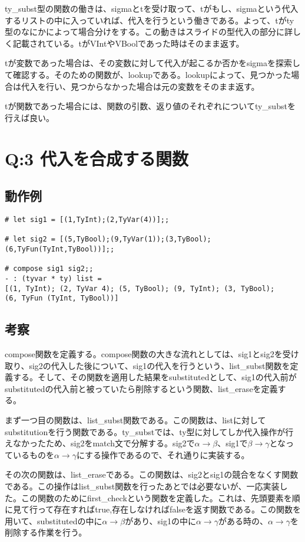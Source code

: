 \documentclass[uplatex,12pt]{jsarticle}
\begin{document}
ty\_subst型の関数の働きは、sigmaとtを受け取って、tがもし、sigmaという代入するリストの中に入っていれば、代入を行うという働きである。よって、tがty型のなにかによって場合分けをする。この動きはスライドの型代入の部分に詳しく記載されている。tがVIntやVBoolであった時はそのまま返す。

tが変数であった場合は、その変数に対して代入が起こるか否かをsigmaを探索して確認する。そのための関数が、lookupである。lookupによって、見つかった場合は代入を行い、見つからなかった場合は元の変数をそのまま返す。

tが関数であった場合には、関数の引数、返り値のそれぞれについてty\_substを行えば良い。

\section{Q:3 代入を合成する関数}

\subsection{動作例}
\begin{lstlisting}[caption=動作例]
# let sig1 = [(1,TyInt);(2,TyVar(4))];;

# let sig2 = [(5,TyBool);(9,TyVar(1));(3,TyBool);(6,TyFun(TyInt,TyBool))];;

# compose sig1 sig2;;
- : (tyvar * ty) list =
[(1, TyInt); (2, TyVar 4); (5, TyBool); (9, TyInt); (3, TyBool);
(6, TyFun (TyInt, TyBool))]

\end{lstlisting}

\subsection{考察}
compose関数を定義する。compose関数の大きな流れとしては、sig1とsig2を受け取り、sig2の代入した後について、sig1の代入を行うという、list\_subst関数を定義する。そして、その関数を適用した結果をsubstitutedとして、sig1の代入前がsubstitutedの代入前と被っていたら削除するという関数、list\_eraseを定義する。

まず一つ目の関数は、list\_subst関数である。この関数は、listに対してsubstitutionを行う関数である。ty\_substでは、ty型に対してしか代入操作が行えなかったため、sig2をmatch文で分解する。sig2で$\alpha \rightarrow \beta $、sig1で$\beta \rightarrow \gamma $となっているものを$\alpha \rightarrow \gamma$にする操作であるので、それ通りに実装する。

その次の関数は、list\_eraseである。この関数は、sig2とsig1の競合をなくす関数である。この操作はlist\_subst関数を行ったあとでは必要ないが、一応実装した。この関数のためにfirst\_checkという関数を定義した。これは、先頭要素を順に見て行って存在すればtrue,存在しなければfalseを返す関数である。この関数を用いて、substitutedの中に$\alpha \rightarrow \beta $があり、sig1の中に$\alpha \rightarrow \gamma$がある時の、$\alpha \rightarrow \gamma$を削除する作業を行う。
\end{document}
